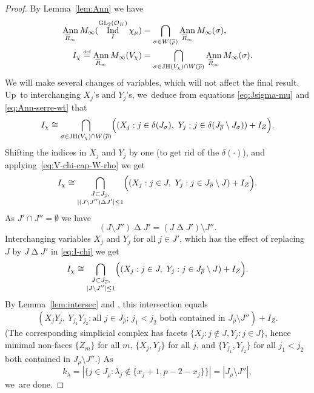 \documentclass[JEP,XML,SOM,Unicode,NoFloatCountersInSection, NoEqCountersInSection,published]{cedram}
\let\ovl\overline
\newcommand{\defeq}{\stackrel{\textrm{\tiny{\upshape{def}}}}{=}}
\newcommand{\cO}{\mathcal{O}}
\newcommand{\brho}{\overline{\rho}}
\DeclareMathOperator{\Ann}{Ann}
\DeclareMathOperator{\GL}{GL}
\DeclareMathOperator{\Ind}{Ind}
\DeclareMathOperator{\JH}{\mathrm{JH}}
\theoremstyle{plain}
\theoremstyle{definition}
\begin{document}
\begin{proof}
By Lemma~\ref{lem:Ann} we have
\begin{align*}
\Ann_{\ovl R_\infty} M_\infty(\Ind_I^{\GL_2(\cO_K)} \chi_\mu) &= \bigcap_{\sigma \in W(\brho)} \Ann_{\ovl R_\infty} M_\infty(\sigma), \\
I_\chi \defeq \Ann_{\ovl R_\infty} M_\infty(V_{\chi}) &= \bigcap_{\sigma \in \JH(V_{\chi}) \cap W(\brho)} \Ann_{\ovl R_\infty} M_\infty(\sigma).
\end{align*}
We will make several changes of variables, which will not affect the final result. Up~to interchanging $X_j$'s and $Y_j$'s, we~deduce from equations \eqref{eq:Jsigma-mu} and \eqref{eq:Ann-serre-wt} that
\begin{equation*}
I_\chi \cong \bigcap_{\sigma \in \JH(V_{\chi}) \cap W(\brho)} \Bigl( (X_j: j \in \delta(J_\sigma),\ Y_j: j \in \delta(J_{\brho} \setminus J_\sigma))+I_Z \Bigr).
\end{equation*}
Shifting the indices in $X_j$ and $Y_j$ by one (to get rid of the $\delta(\cdot)$), and applying~\eqref{eq:V-chi-cap-W-rho} we get
\begin{equation}\label{eq:I-chi}
I_\chi \cong \bigcap_{\substack{J \subset J_{\brho},\\ |(J\setminus J'') \mathbin\Delta J'| \le 1}} \Bigl( (X_j: j \in J,\ Y_j: j \in J_{\brho} \setminus J)+I_Z \Bigr).
\end{equation}
As $J' \cap J'' = \emptyset$ we have
\[
(J\setminus J'') \mathbin\Delta J' = (J \mathbin\Delta J')\setminus J''.
\]
Interchanging variables $X_j$ and $Y_j$ for all $j \in J'$, which has the effect of replacing $J$ by $J \mathbin\Delta J'$ in \eqref{eq:I-chi} we get
\begin{equation*}
I_\chi \cong \bigcap_{\substack{J \subset J_{\brho},\\ |J\setminus J''| \le 1}} \Bigl( (X_j: j \in J,\ Y_j: j \in J_{\brho} \setminus J)+I_Z \Bigr).
\end{equation*}
By Lemma~\ref{lem:intersec} and \cite[Th.\,5.1.4]{BH93}, this intersection equals
\begin{equation}\label{eq:I'-chi}
(X_jY_j,\ Y_{j_1} Y_{j_2}: \text{all $j \in J_{\brho}$; $j_1 < j_2$ both contained in $J_{\brho} \setminus J''$})+I_Z.
\end{equation}
(The corresponding simplicial complex has facets $\{X_j: j \notin J, Y_j: j \in J\}$, hence minimal non-faces $\{Z_m\}$ for all $m$, $\{X_j, Y_j\}$ for all $j$, and $\{ Y_{j_1}, Y_{j_2} \}$ for all $j_1 < j_2$ both contained in $J_{\brho} \setminus J''$.)
As
\[
k_\lambda = |\{ j \in J_{\brho}: \lambda_j \notin \{x_j+1,p-2-x_j\}\}| = |J_{\brho} \setminus J''|,
\]
we~are done.
\end{proof}
\end{document}
